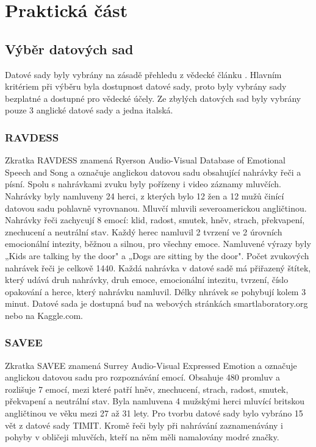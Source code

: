 \documentclass[FM,BP]{tulthesis}
\begin{document}
\chapter{Praktická část}
\section{Výběr datových sad}
Datové sady byly vybrány na zásadě přehledu z vědecké článku \cite{DBLP:journals/speech/AkcayO20}. Hlavním kritériem při výběru byla dostupnost datové sady, proto byly vybrány sady bezplatné a dostupné pro vědecké účely. Ze zbylých datových sad byly vybrány pouze 3 anglické datové sady a jedna italská.

\subsection{RAVDESS}
Zkratka RAVDESS znamená Ryerson Audio-Visual Database of Emotional Speech and Song a označuje anglickou datovou sadu obsahující nahrávky řeči a písní. Spolu s nahrávkami zvuku byly pořízeny i video záznamy mluvčích. Nahrávky byly namluveny 24 herci, z kterých bylo 12 žen a 12 mužů činící datovou sadu pohlavně vyrovnanou. Mluvčí mluvili severoamerickou angličtinou. Nahrávky řeči zachycují 8 emocí: klid, radost, smutek, hněv, strach, překvapení, znechucení a neutrální stav. Každý herec namluvil 2 tvrzení ve 2 úrovních emocionální intezity, běžnou a silnou, pro všechny emoce. Namluvené výrazy byly „Kids are talking by the door" a „Dogs are sitting by the door". Počet zvukových nahrávek řeči je celkově 1440. Každá nahrávka v datové sadě má přiřazený štítek, který udává druh nahrávky, druh emoce, emocionální intezitu, tvrzení, číslo opakování a herce, který nahrávku namluvil. Délky nhrávek se pohybují kolem 3 minut. Datové sada je dostupná buď na webových stránkách smartlaboratory.org nebo na Kaggle.com.\cite{smart_lab}

\subsection{SAVEE}
Zkratka SAVEE znamená Surrey Audio-Visual Expressed Emotion a označuje anglickou datovou sadu pro rozpoznávání emocí. Obsahuje 480 promluv a rozlišuje 7 emocí, mezi které patří hněv, znechucení, strach, radost, smutek, překvapení a neutrální stav. Byla namluvena 4 mužskými herci mluvící britskou angličtinou ve věku mezi 27 až 31 lety. Pro tvorbu datové sady bylo vybráno 15 vět z datové sady TIMIT. Kromě řeči byly při nahrávání zaznamenávány i pohyby v obličeji mluvčích, kteří na něm měli namalovány modré značky.\cite{savee}
\end{document}
